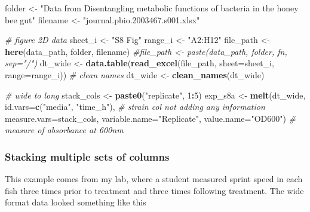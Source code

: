 \documentclass[]{book}
\newenvironment{Shaded}{\begin{snugshade}}{\end{snugshade}}
\newcommand{\KeywordTok}[1]{\textcolor[rgb]{0.13,0.29,0.53}{\textbf{#1}}}
\newcommand{\DataTypeTok}[1]{\textcolor[rgb]{0.13,0.29,0.53}{#1}}
\newcommand{\DecValTok}[1]{\textcolor[rgb]{0.00,0.00,0.81}{#1}}
\newcommand{\StringTok}[1]{\textcolor[rgb]{0.31,0.60,0.02}{#1}}
\newcommand{\CommentTok}[1]{\textcolor[rgb]{0.56,0.35,0.01}{\textit{#1}}}
\newcommand{\OperatorTok}[1]{\textcolor[rgb]{0.81,0.36,0.00}{\textbf{#1}}}
\newcommand{\NormalTok}[1]{#1}
\begin{document}
\begin{Shaded}
\begin{Highlighting}[]
\NormalTok{folder <-}\StringTok{ "Data from Disentangling metabolic functions of bacteria in the honey bee gut"}
\NormalTok{filename <-}\StringTok{ "journal.pbio.2003467.s001.xlsx"}

\CommentTok{# figure 2D data}
\NormalTok{sheet_i <-}\StringTok{ "S8 Fig"}
\NormalTok{range_i <-}\StringTok{ "A2:H12"}
\NormalTok{file_path <-}\StringTok{ }\KeywordTok{here}\NormalTok{(data_path, folder, filename)}
\CommentTok{#file_path <- paste(data_path, folder, fn, sep="/")}
\NormalTok{dt_wide <-}\StringTok{ }\KeywordTok{data.table}\NormalTok{(}\KeywordTok{read_excel}\NormalTok{(file_path, }\DataTypeTok{sheet=}\NormalTok{sheet_i, }\DataTypeTok{range=}\NormalTok{range_i))}
\CommentTok{# clean names}
\NormalTok{dt_wide <-}\StringTok{ }\KeywordTok{clean_names}\NormalTok{(dt_wide)}

\CommentTok{# wide to long}
\NormalTok{stack_cols <-}\StringTok{ }\KeywordTok{paste0}\NormalTok{(}\StringTok{"replicate"}\NormalTok{, }\DecValTok{1}\OperatorTok{:}\DecValTok{5}\NormalTok{)}
\NormalTok{exp_s8a <-}\StringTok{ }\KeywordTok{melt}\NormalTok{(dt_wide,}
              \DataTypeTok{id.vars=}\KeywordTok{c}\NormalTok{(}\StringTok{"media"}\NormalTok{, }\StringTok{"time_h"}\NormalTok{), }\CommentTok{# strain col not adding any information}
              \DataTypeTok{measure.vars=}\NormalTok{stack_cols, }
              \DataTypeTok{variable.name=}\StringTok{"Replicate"}\NormalTok{, }
              \DataTypeTok{value.name=}\StringTok{"OD600"}\NormalTok{) }\CommentTok{# measure of absorbance at 600nm}
\end{Highlighting}
\end{Shaded}

\subsubsection{Stacking multiple sets of
columns}\label{stacking-multiple-sets-of-columns}

This example comes from my lab, where a student measured sprint speed in
each fish three times prior to treatment and three times following
treatment. The wide format data looked something like this
\end{document}
